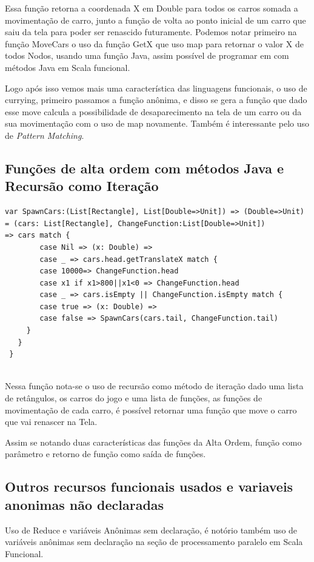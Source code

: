 \documentclass[rel-mlp]{iiufrgs}
\begin{document}
  Essa função retorna a coordenada X em Double para todos os carros somada a movimentação de carro, junto a função de volta ao ponto inicial de um carro que saiu da tela para poder ser renascido futuramente. Podemos notar primeiro na função MoveCars o uso da função GetX que uso map para retornar o valor X de todos Nodos, usando uma função Java, assim possível de programar em com métodos Java em Scala funcional.

   Logo após isso vemos mais uma característica das linguagens funcionais, o uso de currying, primeiro passamos a função anônima, e disso se gera a função que dado esse move calcula a possibilidade de desaparecimento na tela de um carro ou da sua movimentação com o uso de map novamente. Também é interessante pelo uso de \textit{Pattern Matching}.


\subsection{Funções de alta ordem com métodos Java   e Recursão como Iteração}
\begin{lstlisting}
var SpawnCars:(List[Rectangle], List[Double=>Unit]) => (Double=>Unit) = (cars: List[Rectangle], ChangeFunction:List[Double=>Unit])
=> cars match {
        case Nil => (x: Double) =>
        case _ => cars.head.getTranslateX match {
        case 10000=> ChangeFunction.head
        case x1 if x1>800||x1<0 => ChangeFunction.head
        case _ => cars.isEmpty || ChangeFunction.isEmpty match {
        case true => (x: Double) =>
        case false => SpawnCars(cars.tail, ChangeFunction.tail)
     }
   }
 }
 
\end{lstlisting}

Nessa função nota-se o uso de recursão como método de iteração dado uma lista de retângulos, os carros do jogo e uma lista de funções, as funções de movimentação de cada carro, é possível retornar uma função que move o carro que vai renascer na Tela.

Assim se notando duas características das funções da Alta Ordem, função como parâmetro e retorno de função como saída de funções.

\newpage
\subsection{Outros recursos funcionais usados e variaveis anonimas não declaradas}
Uso de Reduce e variáveis Anônimas sem declaração, é notório também uso de variáveis anônimas sem declaração na seção de processamento paralelo em Scala Funcional.
\end{document}

